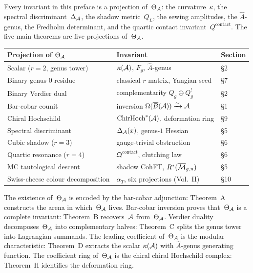 \bigskip
\noindent
Every invariant in this preface is a projection of~$\Theta_{\mathcal{A}}$:
the curvature~$\kappa$, the spectral discriminant~$\Delta_{\mathcal{A}}$,
the shadow metric~$Q_L$, the sewing amplitudes, the $\hat A$-genus,
the Fredholm determinant, and the quartic contact
invariant~$Q^{\mathrm{contact}}$.
The five main theorems are five projections of~$\Theta_{\mathcal{A}}$.

\medskip
\begin{center}
\small
\renewcommand{\arraystretch}{1.15}
\begin{tabular}{lll}
\textbf{Projection of $\Theta_{\mathcal{A}}$}
 & \textbf{Invariant} & \textbf{Section} \\
\hline
Scalar ($r=2$, genus tower)
 & $\kappa(\mathcal{A})$, $F_g$, $\hat A$-genus
 & \S2 \\[2pt]
Binary genus-$0$ residue
 & classical $r$-matrix, Yangian seed
 & \S7 \\[2pt]
Binary Verdier dual
 & complementarity $Q_g \oplus Q_g^!$
 & \S2 \\[2pt]
Bar-cobar counit
 & inversion $\Omega(\overline{B}(\mathcal{A}))\xrightarrow{\sim}\mathcal{A}$
 & \S1 \\[2pt]
Chiral Hochschild
 & $\mathrm{ChirHoch}^*(\mathcal{A})$, deformation ring
 & \S9 \\[2pt]
Spectral discriminant
 & $\Delta_{\mathcal{A}}(x)$, genus-$1$ Hessian
 & \S5 \\[2pt]
Cubic shadow ($r=3$)
 & gauge-trivial obstruction
 & \S6 \\[2pt]
Quartic resonance ($r=4$)
 & $\mathfrak Q^{\mathrm{contact}}$, clutching law
 & \S6 \\[2pt]
MC tautological descent
 & shadow CohFT, $R^*(\overline{\mathcal{M}}_{g,n})$
 & \S5 \\[2pt]
Swiss-cheese colour decomposition
 & $\alpha_T$, six projections (Vol.~II)
 & \S10
\end{tabular}
\end{center}
\medskip

\noindent
The existence of~$\Theta_{\mathcal{A}}$ is encoded by the bar-cobar
adjunction: Theorem~A constructs the arena in which~$\Theta_{\mathcal{A}}$
lives. Bar-cobar inversion proves that~$\Theta_{\mathcal{A}}$ is a complete
invariant: Theorem~B recovers~$\mathcal{A}$ from~$\Theta_{\mathcal{A}}$. Verdier
duality decomposes~$\Theta_{\mathcal{A}}$ into complementary halves: Theorem~C
splits the genus tower into Lagrangian summands. The leading
coefficient of~$\Theta_{\mathcal{A}}$ is the modular characteristic: Theorem~D
extracts the scalar $\kappa(\mathcal{A})$ with $\hat A$-genus generating
function. The coefficient ring of~$\Theta_{\mathcal{A}}$ is the chiral
chiral Hochschild complex: Theorem~H identifies the deformation ring.

